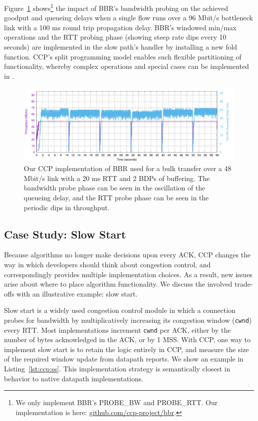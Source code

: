 Figure~\ref{fig:ccp:bbr} shows\footnote{We only implement BBR's PROBE\_BW and PROBE\_RTT. Our implementation is here: \url{github.com/ccp-project/bbr}.}
the impact of BBR's bandwidth probing on the
achieved goodput and queueing delays when a single flow runs over a 96 Mbit/s
bottleneck link with a 100 ms round trip propagation delay.
%
BBR's windowed min/max operations and the RTT probing phase (showing steep rate
dips every 10 seconds) are implemented in the slow path's 
handler by installing a new fold function.
%
CCP's split programming model enables such flexible partitioning of
functionality, whereby complex operations and special cases can be implemented
in \userspace.

\begin{figure}[t]
\centering
    \includegraphics[width=\columnwidth]{img/bbr}
    \caption{
    Our CCP implementation of BBR used for a bulk transfer over a 48 Mbit/s link with a 20 ms RTT and 2 BDPs of buffering. The bandwidth probe phase can be seen in the oscillation of the queueing delay, and the RTT probe phase can be seen in the periodic dips in throughput.
    }\label{fig:ccp:bbr}
\end{figure}

\subsection{Case Study: Slow Start}
\label{s:ccp:ss}

Because algorithms no longer make decisions upon every ACK, CCP changes the way in which developers should think about congestion control, and correspondingly provides multiple implementation choices. As a result, new issues arise about where to place algorithm functionality. We discuss the involved trade-offs with an illustrative example: slow start.

Slow start is a widely used congestion control module in which a connection probes for bandwidth by multiplicatively increasing its congestion window (\texttt{cwnd}) every RTT. Most implementations increment \texttt{cwnd} per ACK, either by the number of bytes acknowledged in the ACK, or by 1 MSS. With CCP, one way to implement slow start is to retain the logic entirely in CCP, and measure the size of the required window update from datapath reports. We show an example in Listing~\ref{lst:ccp:ss}. This implementation strategy is semantically closest in behavior to native datapath implementations.

